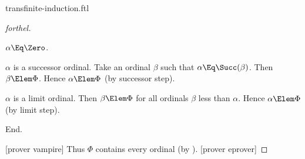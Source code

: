 \documentclass{stex}
\begin{document}
\begin{smodule}{transfinite-induction.ftl}
\begin{proof}[forthel]
    \begin{case}{$\alpha \Eq \Zero$.} \end{case}

    \begin{case}{$\alpha$ is a successor ordinal.}
      Take an ordinal $\beta$ such that $\alpha \Eq \Succ(\beta)$.
      Then $\beta \Elem \Phi$.
      Hence $\alpha \Elem \Phi$ (by successor step).
    \end{case}

    \begin{case}{$\alpha$ is a limit ordinal.}
      Then $\beta \Elem \Phi$ for all ordinals $\beta$ less than $\alpha$.
      Hence $\alpha \Elem \Phi$ (by limit step).
    \end{case}
  End.

  [prover vampire]
  Thus $\Phi$ contains every ordinal (by ).
  [prover eprover]
\end{proof}

\end{smodule}
\end{document}

